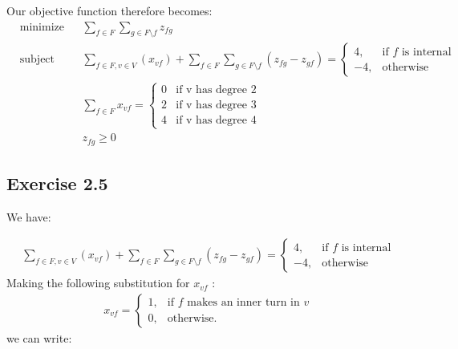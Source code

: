 \documentclass[12pt]{article}
\begin{document}
  Our objective function therefore becomes:
  \begin{equation*}
    \begin{aligned}
    & {\text{minimize}}
    & & \sum_{f \in F}\sum_{g \in F \setminus f} z_{fg} \\
    & \text{subject to}
    & & \sum_{f \in F, v \in V}(x_{vf}) + \sum_{f \in F}\sum_{g \in F \setminus f}(z_{fg} - z_{gf}) = \begin{cases}
                                                                                      4, & \text{if } f \text{ is internal}\\
                                                                                      -4, & \text{otherwise}
                                                                                     \end{cases} \\
    & & &  \sum_{f \in F}{x_{vf}} = \begin{cases}
                                        0 & \text{if v has degree 2}\\
                                        2 & \text{if v has degree 3}\\
                                        4 & \text{if v has degree 4}
                                    \end{cases}\\
    & & & z_{fg} \geq 0
    \end{aligned}
  \end{equation*}

\subsection*{Exercise 2.5}

We have:

\begin{align*}
      \sum_{f \in F, v \in V}(x_{vf}) + \sum_{f \in F}\sum_{g \in F \setminus f}(z_{fg} - z_{gf}) = \begin{cases}
                                                                                       4, & \text{if } f \text{ is internal}\\
                                                                                      -4, & \text{otherwise}
                                                                                   \end{cases}
\end{align*}
Making the following substitution for $x_{vf}$ :
\begin{align*}
  x_{vf} =  \begin{cases}
               1, & \text{if } f \text{ makes an inner turn in } v \\
               0, & \text{otherwise.}
            \end{cases}
\end{align*}
we can write:
\end{document}
